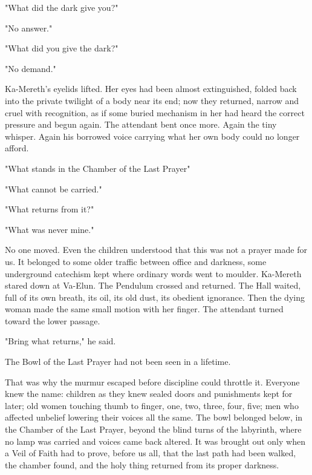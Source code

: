 "What did the dark give you?" \par
"No answer." \par
"What did you give the dark?" \par
"No demand." \par

Ka-Mereth’s eyelids lifted.
Her eyes had been almost extinguished, folded back into the private twilight of a body near its end; now they returned, narrow and cruel with recognition, 
as if some buried mechanism in her had heard the correct pressure and begun again. 
The attendant bent once more. 
Again the tiny whisper. 
Again his borrowed voice carrying what her own body could no longer afford. \par

"What stands in the Chamber of the Last Prayer" \par
"What cannot be carried." \par
"What returns from it?" \par
"What was never mine." \par

No one moved. 
Even the children understood that this was not a prayer made for us. 
It belonged to some older traffic between office and darkness, some underground catechism kept where ordinary words went to moulder. 
Ka-Mereth stared down at Va-Elun. 
The Pendulum crossed and returned. 
The Hall waited, full of its own breath, its oil, its old dust, its obedient ignorance.
Then the dying woman made the same small motion with her finger.
The attendant turned toward the lower passage. \par

"Bring what returns," he said. \par

The Bowl of the Last Prayer had not been seen in a lifetime. \par

That was why the murmur escaped before discipline could throttle it. 
Everyone knew the name: children as they knew sealed doors and punishments kept for later; old women touching thumb to finger, 
one, two, three, four, five; men who affected unbelief lowering their voices all the same. 
The bowl belonged below, in the Chamber of the Last Prayer, beyond the blind turns of the labyrinth, where no lamp was carried and voices came back altered. 
It was brought out only when a Veil of Faith had to prove, before us all, that the last path had been walked, the chamber found, and the holy thing returned 
from its proper darkness. \par

